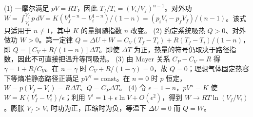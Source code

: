 (1) 一摩尔满足 \(pV=RT\)，因此 \(T_f/T_i=(V_i/V_f)^{n-1}\)。对外功 \(W=\int_{V_i}^{V_f}p\,dV=K(V_f^{1-n}-V_i^{1-n})/(1-n)=(p_iV_i-p_fV_f)/(n-1)\)。该式只适用于 \(n\ne1\)，其中 \(K\) 的量纲随指数 \(n\) 改变。
(2) 约定系统吸热 \(Q>0\)、对外做功 \(W>0\)。第一定律 \(Q=\Delta U+W=C_V(T_f-T_i)+R(T_f-T_i)/(1-n)\)，即 \(Q=[C_V+R/(1-n)]\Delta T\)。即使 \(\Delta T\) 为正，热量的符号仍取决于路径指数，因此不可直接把温升等同吸热。
(3) 由 Mayer 关系 \(C_P-C_V=R\) 得 \(\gamma=1+R/C_V\)。在 \(n=\gamma\) 时 \(C_V+R/(1-\gamma)=0\)，故 \(Q=0\)；理想气体固定热容下等熵准静态路径正满足 \(pV^\gamma=\mathrm{const}\)。在 \(n=0\) 时 \(p\) 恒定，\(W=p(V_f-V_i)=R\Delta T\)、\(Q=C_P\Delta T\)。
(4) 令 \(\epsilon=1-n\)，\(pV^n=K\) 使 \(W=K(V_f^\epsilon-V_i^\epsilon)/\epsilon\)；利用 \(V^\epsilon=1+\epsilon\ln V+O(\epsilon^2)\)，得到 \(W\to RT\ln(V_f/V_i)\)。膨胀 \(V_f>V_i\) 时功为正，压缩时为负，等温下 \(\Delta U=0\) 而 \(Q=W\)。
